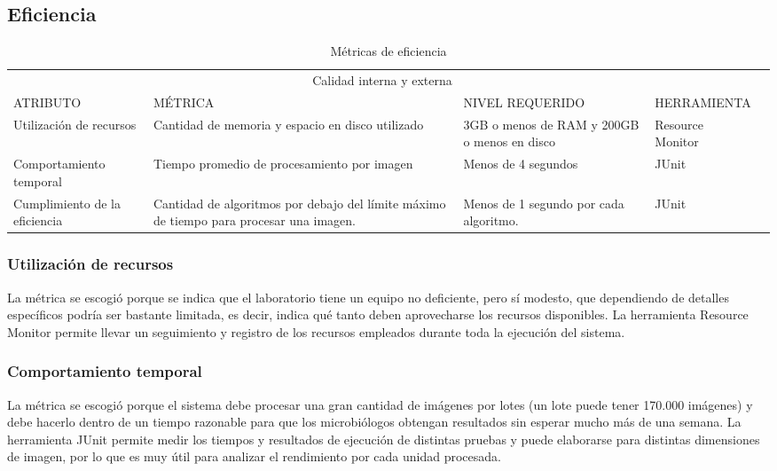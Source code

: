 \documentclass[12pt]{article}
\begin{document}
\subsection{Eficiencia}%
\vspace*{0.3in}
\begin{table}[htb]%
\centering
\begin{tabular}{|p{4cm}|p{4cm}|p{4cm}|p{4cm}|p{4cm}|}
\hline
\multicolumn{4}{|c|}{Calidad interna y externa   } \\
\cline{1-4}
ATRIBUTO & MÉTRICA & NIVEL REQUERIDO & HERRAMIENTA\\
\hline \hline
Utilización de recursos 
& Cantidad de memoria y espacio en disco utilizado
& 3GB o menos de RAM y 200GB o menos en disco
& Resource Monitor\\ \cline{1-4}
\hline
Comportamiento temporal 
& Tiempo promedio de procesamiento por imagen
& Menos de 4 segundos 
& JUnit\\ \cline{1-4}
\hline
Cumplimiento de la eficiencia
& Cantidad de algoritmos por debajo del límite máximo de tiempo para procesar una imagen.
& Menos de 1 segundo por cada algoritmo.
& JUnit\\ \cline{1-4}
\hline
\end{tabular}
\caption{Métricas de eficiencia}
\label{tabla:final}
\end{table}%
\vspace*{0.3in}
\subsubsection{Utilización de recursos}
\vspace*{0.1in}
La métrica se escogió porque se indica que el laboratorio tiene un equipo no deficiente, pero sí modesto, que dependiendo de detalles específicos podría ser bastante limitada, es decir, indica qué tanto deben aprovecharse los recursos disponibles. La herramienta Resource Monitor permite llevar un seguimiento y registro de los recursos empleados durante toda la ejecución del sistema.
\vspace*{0.3in}
\subsubsection{Comportamiento temporal}
\vspace*{0.1in}
La métrica se escogió porque el sistema debe procesar una gran cantidad de imágenes por lotes (un lote puede tener 170.000 imágenes) y debe hacerlo dentro de un tiempo razonable para que los microbiólogos obtengan resultados sin esperar mucho más de una semana. La herramienta JUnit permite medir los tiempos y resultados de ejecución de distintas pruebas y puede elaborarse para distintas dimensiones de imagen, por lo que es muy útil para analizar el rendimiento por cada unidad procesada.
\vspace*{0.3in}
\end{document}
